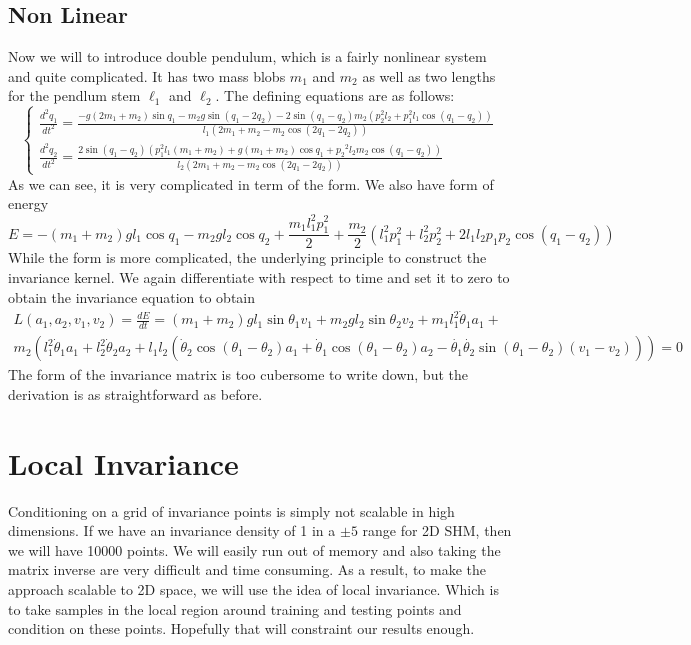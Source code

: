 \documentclass{statsmsc}
\begin{document}
\subsection{Non Linear}
Now we will to introduce double pendulum, which is a fairly nonlinear system and quite complicated. 
It has two mass blobs $m_1$ and $m_2$ as well as two lengths for the pendlum stem $\ell_1$ and $\ell_2$.
The defining equations are as follows:
$$
\begin{cases}
\frac{d^2q_1}{dt^2}=\frac{-g\left(2 m_{1}+m_{2}\right) \sin q_1-m_{2} g \sin \left(q_1-2 q_2\right)-2 \sin \left(q_1-q_2\right) m_{2}\left(p_2^{2} l_{2}+p_1^{2} l_{1} \cos \left(q_1-q_2\right)\right)}{l_{1}\left(2 m_{1}+m_{2}-m_{2} \cos \left(2 q_1-2 q_2\right)\right)} \\
\frac{d^2q_2}{dt^2}=\frac{2 \sin \left(q_1-q_2\right)\left(p_1^{2} l_{1}\left(m_{1}+m_{2}\right)+g\left(m_{1}+m_{2}\right) \cos q_1+p_2{ }^{2} l_{2} m_{2} \cos \left(q_1-q_2\right)\right)}{l_{2}\left(2 m_{1}+m_{2}-m_{2} \cos \left(2 q_1-2 q_2\right)\right)}
\end{cases}
$$
As we can see, it is very complicated in term of the form.
We also have form of energy 
$$
E = -(m_1+m_2)gl_1\cos q_1-m_2gl_2\cos q_2+ \frac{m_1l^2_1p_1^2}{2}+\frac{m_2}{2}(l^2_1p_1^2+l^2_2p_2^2+2l_1l_2p_1p_2\cos(q_1-q_2))
$$
While the form is more complicated, the underlying principle to construct the invariance kernel. 
We again differentiate with respect to time and set it to zero to obtain the invariance equation to obtain 
\begin{gather*}
L(a_1, a_2, v_1, v_2)=\frac{dE}{dt} = (m_1+m_2)gl_1\sin\theta_1v_1+m_2gl_2\sin\theta_2v_2+m_1l_1^2\dot{\theta}_1a_1+\\m_2(l_1^2\dot{\theta}_1a_1+l_2^2\dot{\theta}_2a_2+l_1l_2(\dot{\theta}_2\cos(\theta_1-\theta_2)a_1+\dot{\theta}_1\cos(\theta_1-\theta_2)a_2-\dot{\theta_1}\dot{\theta_2}\sin(\theta_1-\theta_2)(v_1-v_2)))=0
\end{gather*}
The form of the invariance matrix is too cubersome to write down, but the derivation is as straightforward as before. 

\section{Local Invariance}
Conditioning on a grid of invariance points is simply not scalable in high dimensions. 
If we have an invariance density of 1 in a $\pm 5$ range for 2D SHM, then we will have 10000 points. 
We will easily run out of memory and also taking the matrix inverse are very difficult and time consuming.
As a result, to make the approach scalable to 2D space, we will use the idea of local invariance. 
Which is to take samples in the local region around training and testing points and condition on these points.
Hopefully that will constraint our results enough. 
\end{document}
